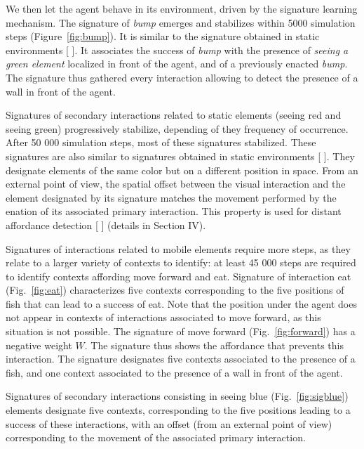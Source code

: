 \documentclass[conference]{IEEEtran}
\begin{document}
We then let the agent behave in its environment, driven by the signature learning mechanism. 
The signature of \textit{bump} emerges and stabilizes within 5000 simulation steps (Figure~\ref{fig:bump}). 
It is similar to the signature obtained in static environments [ ].
It associates the success of \textit{bump} with the presence of \textit{seeing a green element} localized in front of the agent, and of a previously enacted \textit{bump}. 
The signature thus gathered every interaction allowing to detect the presence of a wall in front of the agent. 

Signatures of secondary interactions related to static elements (seeing red and seeing green) progressively stabilize, depending of they frequency of occurrence. After 50 000 simulation steps, most of these signatures stabilized. These signatures are also similar to signatures obtained in static environments [ ]. They designate elements of the same color but on a different position in space. From an external point of view, the spatial offset between the visual interaction and the element designated by its signature matches the movement performed by the enation of its associated primary interaction. This property is used for distant affordance detection [ ] (details in Section IV).


Signatures of interactions related to mobile elements require more steps, as they relate to a larger variety of contexts to identify: at least 45 000 steps are required to identify contexts affording move forward and eat. Signature of interaction eat (Fig.~\ref{fig:eat}) characterizes five contexts corresponding to the five positions of fish that can lead to a success of eat. Note that the position under the agent does not appear in contexts of interactions associated to move forward, as this situation is not possible. The signature of move forward (Fig.~\ref{fig:forward}) has a negative weight $W$. The signature thus shows the affordance that prevents this interaction. The signature designates five contexts associated to the presence of a fish, and one context associated to the presence of a wall in front of the agent.

Signatures of secondary interactions consisting in seeing blue (Fig.~\ref{fig:sigblue}) elements designate five contexts, corresponding to the five positions leading to a success of these interactions, with an offset (from an external point of view) corresponding to the movement of the associated primary interaction.
\end{document}
